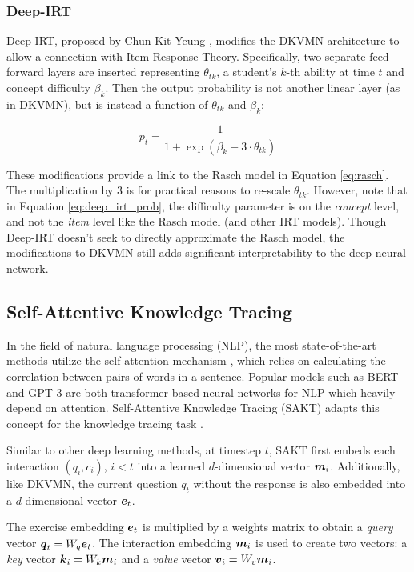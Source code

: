 \subsubsection{Deep-IRT}
Deep-IRT, proposed by Chun-Kit Yeung \cite{yeung_2019}, modifies the DKVMN architecture to allow a connection with Item Response Theory. Specifically, two separate feed forward layers are inserted representing $\theta_{tk}$, a student's $k$-th ability at time $t$ and concept difficulty $\beta_k$. Then the output probability is not another linear layer (as in DKVMN), but is instead a function of $\theta_{tk}$ and $\beta_k$:

\begin{equation}
  p_t = \frac{1}{1 + \exp\left( \beta_k - 3\cdot \theta_{tk} \right)}
  \label{eq:deep_irt_prob}
\end{equation}

These modifications provide a link to the Rasch model in Equation \ref{eq:rasch}. The multiplication by 3 is for practical reasons to re-scale $\theta_{tk}$. However, note that in Equation \ref{eq:deep_irt_prob}, the difficulty parameter is on the \textit{concept} level, and not the \textit{item} level like the Rasch model (and other IRT models). Though Deep-IRT doesn't seek to directly approximate the Rasch model, the modifications to DKVMN still adds significant interpretability to the deep neural network.


\subsection{Self-Attentive Knowledge Tracing}\label{sec:sakt}
In the field of natural language processing (NLP), the most state-of-the-art methods utilize the self-attention mechanism \cite{vaswani2017}, which relies on calculating the correlation between pairs of words in a sentence. Popular models such as BERT \cite{bert} and GPT-3 \cite{gpt3} are both transformer-based neural networks for NLP which heavily depend on attention. Self-Attentive Knowledge Tracing (SAKT) adapts this concept for the knowledge tracing task \cite{pandey2019}. 

Similar to other deep learning methods, at timestep $t$, SAKT first embeds each interaction $(q_i, c_i)$, $i<t$ into a learned $d$-dimensional vector $\boldsymbol{m}_i$. Additionally, like DKVMN, the current question $q_t$ without the response is also embedded into a $d$-dimensional vector $\boldsymbol{e}_t$. 

The exercise embedding $\boldsymbol{e}_t$ is multiplied by a weights matrix to obtain a \textit{query} vector $\boldsymbol{q}_t = W_{q} \boldsymbol{e}_t$. The interaction embedding $\boldsymbol{m}_i$ is used to create two vectors: a \textit{key} vector $\boldsymbol{k}_i = W_{k} \boldsymbol{m}_i$ and a \textit{value} vector $\boldsymbol{v}_i = W_v \boldsymbol{m}_i$. 

